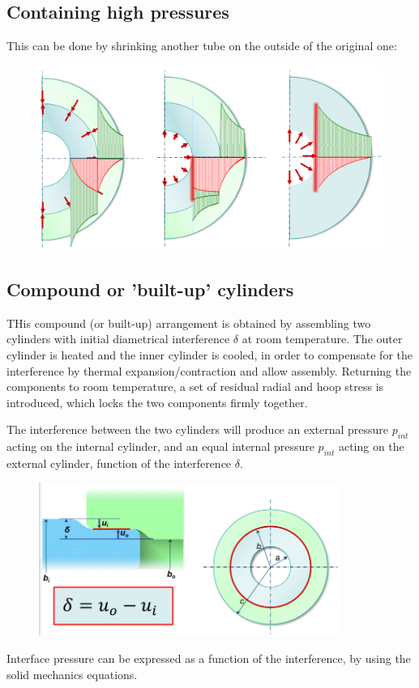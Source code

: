 \documentclass[class=report, crop=false, 12pt,a4paper]{standalone}
\begin{document}
\subsection{Containing high pressures}
This can be done by shrinking another tube on the outside of the original one:
\begin{figure}[H]
    \centering
    \includegraphics[width = \textwidth]{../img/diagram120.png}
    \caption{}
\end{figure}
\subsection{Compound or 'built-up' cylinders}
THis compound (or built-up) arrangement is obtained by assembling two cylinders with initial diametrical interference $\delta$ at room temperature. The outer cylinder is heated and the inner cylinder is cooled, in order to compensate for the interference by thermal expansion/contraction and allow assembly. Returning the components to room temperature, a set of residual radial and hoop stress is introduced, which locks the two components firmly together. 

The interference between the two cylinders will produce an external pressure $p_{int}$ acting on the internal cylinder, and an equal internal pressure $p_{int}$ acting on the external cylinder, function of the interference $\delta$. 
\begin{figure}[H]
    \centering
    \includegraphics[height = 5cm]{../img/diagram121.png}
    \caption{}
\end{figure}
Interface pressure can be expressed as a function of the interference, by using the solid mechanics equations.
\end{document}
